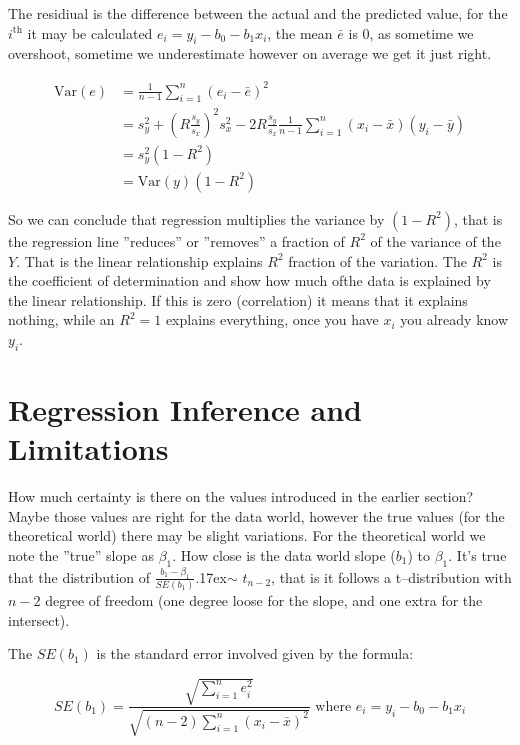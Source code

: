 The residiual is the difference between the actual and the predicted value, for
the $i^{\mbox{th}}$ it may be calculated $e_i=y_i-b_0-b_1 x_i$, the mean
$\bar{e}$ is $0$, as sometime we overshoot, sometime we underestimate however on
average we get it just right.

\begin{align*}
	\mbox{Var} (e) & =\frac{1}{n-1}\sum_{i=1}^{n} (e_i -
	\bar{e})^2                                                                   \\
	               & = s_y^2 + (R \frac{s_y}{s_x})^2 s_x^2 - 2 R \frac{s_y}{s_x}
	\frac{1}{n-1} \sum_{i=1}^{n} (x_i - \bar{x})(y_i - \bar{y})                  \\
	               & = s_y^2 (1-R^2)                                             \\
	               & = \mbox{Var}(y)(1-R^2)
\end{align*}

So we can conclude that regression multiplies the variance by $(1-R^2)$, that is
the regression line ''reduces'' or ''removes'' a fraction of $R^2$ of the
variance of the $Y$. That is the linear relationship explains $R^2$ fraction of
the variation. The $R^2$ is the coefficient of determination and show how much
ofthe data is explained by the linear relationship. If this is zero
(correlation) it means that it explains nothing, while an $R^2=1$ explains
everything, once you have $x_i$ you already know $y_i$.


\section{Regression Inference and Limitations}

How much certainty is there on the values introduced in the earlier section?
Maybe those values are right for the data world, however the true values (for
the theoretical world) there may be slight variations. For the theoretical world
we note the ''true'' slope as $\beta_1$. How close is the data world slope
($b_1$) to $\beta_1$. It's true that the distribution of
$\frac{b_1-\beta_1}{SE(b_1)} ${\raise.17ex\hbox{$\scriptstyle\sim$}} $ t_{n-2}$,
that is it follows a t--distribution with $n-2$ degree of freedom (one degree
loose for the slope, and one extra for the intersect).

The $SE(b_1)$ is the standard error involved given by the formula:

\[ SE(b_1) = \frac{\sqrt{\sum_{i=1}^n e_i^2}}{\sqrt{(n-2) \sum_{i=1}^n (x_i -
			\bar{x})^2 }} \mbox{ where } e_i = y_i -b_0 - b_1 x_i
\]

